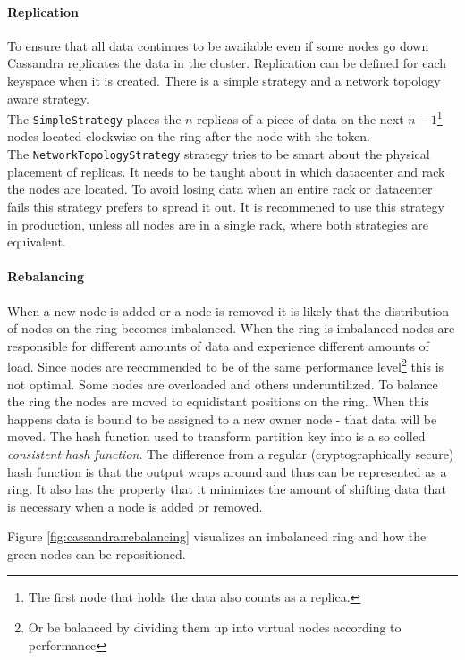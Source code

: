 \paragraph{Replication} To ensure that all data continues to be available even if some nodes go down Cassandra replicates the data in the cluster. Replication can be defined for each keyspace when it is created. There is a simple strategy and a network topology aware strategy. \\
The \texttt{SimpleStrategy} places the $n$ replicas of a piece of data on the next $n-1$\footnote{The first node that holds the data also counts as a replica.} nodes located clockwise on the ring after the node with the token. \\
The \texttt{NetworkTopologyStrategy} strategy tries to be smart about the physical placement of replicas. It needs to be taught about in which datacenter and rack the nodes are located. To avoid losing data when an entire rack or datacenter fails this strategy prefers to spread it out.
It is recommened to use this strategy in production, unless all nodes are in a single rack, where both strategies are equivalent.  %

\paragraph{Rebalancing}

When a new node is added or a node is removed it is likely that the distribution of nodes on the ring becomes imbalanced. When the ring is imbalanced nodes are responsible for different amounts of data and experience different amounts of load. Since nodes are recommended to be of the same performance level\footnote{Or be balanced by dividing them up into virtual nodes according to performance} this is not optimal. Some nodes are overloaded and others underuntilized.
To balance the ring the nodes are moved to equidistant positions on the ring. When this happens data is bound to be assigned to a new owner node - that data will be moved.
The hash function used to transform partition key into is a so colled \textit{consistent hash function}. The difference from a regular (cryptographically secure) hash function is that the output wraps around and thus can be represented as a ring. It also has the property that it minimizes the amount of shifting data that is necessary when a node is added or removed.

Figure \ref{fig:cassandra:rebalancing} visualizes an imbalanced ring and how the green nodes can be repositioned.


